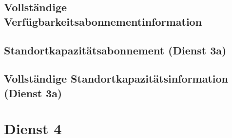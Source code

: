 \subsection*{Vollständige Verfügbarkeitsabonnementinformation}
\label{subsec:Nachrichten:Dienst3:CompleteAvailability}



\medskip




\subsection*{Standortkapazitätsabonnement (Dienst 3a)}
\label{subsec:Nachrichten:Dienst3:PlaceAvailabilitySubscription}





% 

% 



\subsection*{Vollständige Standortkapazitätsinformation (Dienst 3a)}
\label{subsec:Nachrichten:Dienst3:CompletePlaceAvailability}





\section{Dienst 4}
\label{sec:Nachrichten:Dienst4}

